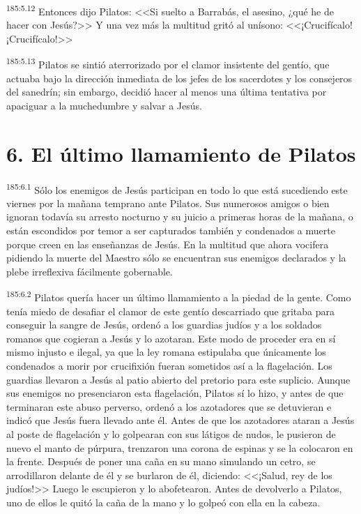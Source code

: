 \par 
\textsuperscript{185:5.12} Entonces dijo Pilatos: <<Si suelto a Barrabás, el asesino, ¿qué he de hacer con Jesús?>> Y una vez más la multitud gritó al unísono: <<¡Crucifícalo! ¡Crucifícalo!>>

\par 
\textsuperscript{185:5.13} Pilatos se sintió aterrorizado por el clamor insistente del gentío, que actuaba bajo la dirección inmediata de los jefes de los sacerdotes y los consejeros del sanedrín; sin embargo, decidió hacer al menos una última tentativa por apaciguar a la muchedumbre y salvar a Jesús.

\section*{6. El último llamamiento de Pilatos}
\par 
\textsuperscript{185:6.1} Sólo los enemigos de Jesús participan en todo lo que está sucediendo este viernes por la mañana temprano ante Pilatos. Sus numerosos amigos o bien ignoran todavía su arresto nocturno y su juicio a primeras horas de la mañana, o están escondidos por temor a ser capturados también y condenados a muerte porque creen en las enseñanzas de Jesús. En la multitud que ahora vocifera pidiendo la muerte del Maestro sólo se encuentran sus enemigos declarados y la plebe irreflexiva fácilmente gobernable.

\par 
\textsuperscript{185:6.2} Pilatos quería hacer un último llamamiento a la piedad de la gente. Como tenía miedo de desafiar el clamor de este gentío descarriado que gritaba para conseguir la sangre de Jesús, ordenó a los guardias judíos y a los soldados romanos que cogieran a Jesús y lo azotaran. Este modo de proceder era en sí mismo injusto e ilegal, ya que la ley romana estipulaba que únicamente los condenados a morir por crucifixión fueran sometidos así a la flagelación. Los guardias llevaron a Jesús al patio abierto del pretorio para este suplicio. Aunque sus enemigos no presenciaron esta flagelación, Pilatos sí lo hizo, y antes de que terminaran este abuso perverso, ordenó a los azotadores que se detuvieran e indicó que Jesús fuera llevado ante él. Antes de que los azotadores ataran a Jesús al poste de flagelación y lo golpearan con sus látigos de nudos, le pusieron de nuevo el manto de púrpura, trenzaron una corona de espinas y se la colocaron en la frente. Después de poner una caña en su mano simulando un cetro, se arrodillaron delante de él y se burlaron de él, diciendo: <<¡Salud, rey de los judíos!>> Luego le escupieron y lo abofetearon. Antes de devolverlo a Pilatos, uno de ellos le quitó la caña de la mano y lo golpeó con ella en la cabeza.

